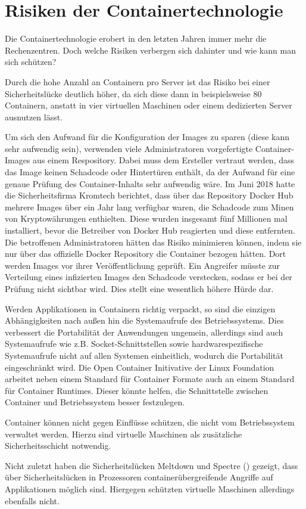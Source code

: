 \section{Risiken der Containertechnologie}
\label{sec:Risiken der Containertechnologie}
Die Containertechnologie erobert in den letzten Jahren immer mehr die Rechenzentren. Doch welche Risiken verbergen sich dahinter und wie kann man sich schützen?

Durch die hohe Anzahl an Containern pro Server ist das Risiko bei einer Sicherheitslücke deutlich höher, da sich diese dann in beispielsweise 80 Containern, anstatt in vier virtuellen Maschinen oder einem dedizierten Server ausnutzen lässt.

Um sich den Aufwand für die Konfiguration der Images zu sparen (diese kann sehr aufwendig sein), verwenden viele Administratoren vorgefertigte Container-Images aus einem Respository.
Dabei muss dem Ersteller vertraut werden, dass das Image keinen Schadcode oder Hintertüren enthält, da der Aufwand für eine genaue Prüfung des Container-Inhalts sehr aufwendig wäre.
Im Juni 2018 hatte die Sicherheitsfirma Kromtech berichtet, dass über das Repository Docker Hub mehrere Images über ein Jahr lang verfügbar waren, die Schadcode zum Minen von Kryptowährungen enthielten.
Diese wurden insgesamt fünf Millionen mal installiert, bevor die Betreiber von Docker Hub reagierten und diese entfernten.
\citep{kromtech}
Die betroffenen Administratoren hätten das Risiko minimieren können, indem sie nur über das offizielle Docker Repository die Container bezogen hätten.
Dort werden Images vor ihrer Veröffentlichung geprüft.
\citep{DockerHubOfficial}
Ein Angreifer müsste zur Verteilung eines infizierten Images den Schadcode verstecken, sodass er bei der Prüfung nicht sichtbar wird. Dies stellt eine wesentlich höhere Hürde dar.

Werden Applikationen in Containern richtig verpackt, so sind die einzigen Abhängigkeiten nach außen hin die Systemaufrufe des Betriebssystems.
Dies verbessert die Portabilität der Anwendungen ungemein, allerdings sind auch Systemaufrufe wie z.B. Socket-Schnittstellen sowie hardwarespezifische Systemaufrufe nicht auf allen Systemen einheitlich, wodurch die Portabilität eingeschränkt wird.
Die Open Container Initivative der Linux Foundation arbeitet neben einem Standard für Container Formate auch an einem Standard für Container Runtimes.
Dieser könnte helfen, die Schnittstelle zwischen Container und Betriebssystem besser festzulegen.

Container können nicht gegen Einflüsse schützen, die nicht vom Betriebssystem verwaltet werden. Hierzu sind virtuelle Maschinen als zusätzliche Sicherheitsschicht notwendig. \citep{11517836120160501}

Nicht zuletzt haben die Sicherheitslücken Meltdown \citep{DBLP:journals/corr/abs-1801-01207} und Spectre (\citep{DBLP:journals/corr/abs-1801-01203}) gezeigt, dass über Sicherheitslücken in Prozessoren containerübergreifende Angriffe auf Applikationen möglich sind. Hiergegen schützten virtuelle Maschinen allerdings ebenfalls nicht.  
